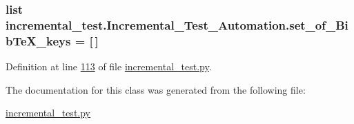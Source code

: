 \subsubsection[{set\+\_\+of\+\_\+\+Bib\+Te\+X\+\_\+keys}]{\setlength{\rightskip}{0pt plus 5cm}list incremental\+\_\+test.\+Incremental\+\_\+\+Test\+\_\+\+Automation.\+set\+\_\+of\+\_\+\+Bib\+Te\+X\+\_\+keys = \mbox{[}$\,$\mbox{]}\hspace{0.3cm}{\ttfamily [static]}}\label{classincremental__test_1_1Incremental__Test__Automation_a8f5272e0488026aa24a829262392f2f7}


Definition at line \hyperlink{incremental__test_8py_source_l00113}{113} of file \hyperlink{incremental__test_8py_source}{incremental\+\_\+test.\+py}.



The documentation for this class was generated from the following file\+:\begin{DoxyCompactItemize}
\item 
\hyperlink{incremental__test_8py}{incremental\+\_\+test.\+py}\end{DoxyCompactItemize}
